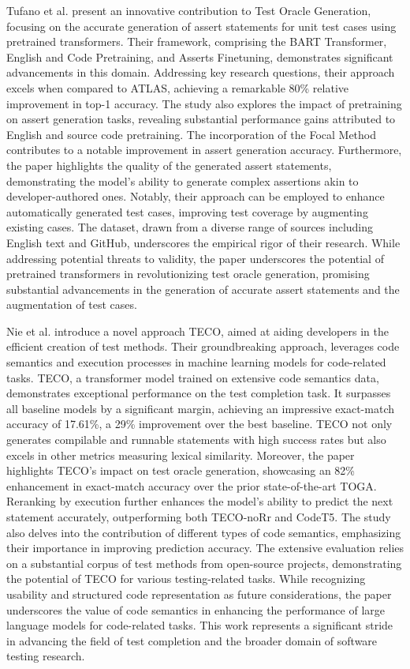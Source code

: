 Tufano et al. present an innovative contribution\cite{tufano_generating_2022} to Test Oracle Generation, focusing on the accurate generation of assert statements for unit test cases using pretrained transformers. Their framework, comprising the BART Transformer, English and Code Pretraining, and Asserts Finetuning, demonstrates significant advancements in this domain. Addressing key research questions, their approach excels when compared to ATLAS, achieving a remarkable 80\% relative improvement in top-1 accuracy. The study also explores the impact of pretraining on assert generation tasks, revealing substantial performance gains attributed to English and source code pretraining. The incorporation of the Focal Method contributes to a notable improvement in assert generation accuracy. Furthermore, the paper highlights the quality of the generated assert statements, demonstrating the model's ability to generate complex assertions akin to developer-authored ones. Notably, their approach can be employed to enhance automatically generated test cases, improving test coverage by augmenting existing cases. The dataset, drawn from a diverse range of sources including English text and GitHub, underscores the empirical rigor of their research. While addressing potential threats to validity, the paper underscores the potential of pretrained transformers in revolutionizing test oracle generation, promising substantial advancements in the generation of accurate assert statements and the augmentation of test cases.

Nie et al. introduce a novel approach TECO\cite{nie_learning_2023}, aimed at aiding developers in the efficient creation of test methods. Their groundbreaking approach, leverages code semantics and execution processes in machine learning models for code-related tasks. TECO, a transformer model trained on extensive code semantics data, demonstrates exceptional performance on the test completion task. It surpasses all baseline models by a significant margin, achieving an impressive exact-match accuracy of 17.61\%, a 29\% improvement over the best baseline. TECO not only generates compilable and runnable statements with high success rates but also excels in other metrics measuring lexical similarity. Moreover, the paper highlights TECO's impact on test oracle generation, showcasing an 82\% enhancement in exact-match accuracy over the prior state-of-the-art TOGA. Reranking by execution further enhances the model's ability to predict the next statement accurately, outperforming both TECO-noRr and CodeT5. The study also delves into the contribution of different types of code semantics, emphasizing their importance in improving prediction accuracy. The extensive evaluation relies on a substantial corpus of test methods from open-source projects, demonstrating the potential of TECO for various testing-related tasks. While recognizing usability and structured code representation as future considerations, the paper underscores the value of code semantics in enhancing the performance of large language models for code-related tasks. This work represents a significant stride in advancing the field of test completion and the broader domain of software testing research.

